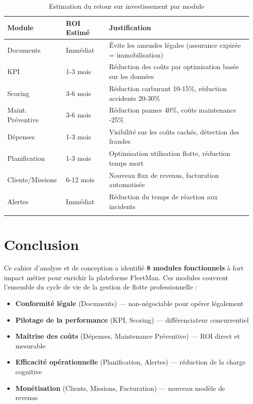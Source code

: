 \documentclass[12pt,a4paper]{report}
\begin{document}
\begin{longtable}{p{3.5cm}p{3.5cm}p{6cm}}
\toprule
\textbf{Module} & \textbf{ROI Estimé} & \textbf{Justification} \\
\midrule
\endhead
Documents & Immédiat & Évite les amendes légales (assurance expirée = immobilisation) \\
KPI & 1-3 mois & Réduction des coûts par optimisation basée sur les données \\
Scoring & 3-6 mois & Réduction carburant 10-15\%, réduction accidents 20-30\% \\
Maint. Préventive & 3-6 mois & Réduction pannes 40\%, coûts maintenance -25\% \\
Dépenses & 1-3 mois & Visibilité sur les coûts cachés, détection des fraudes \\
Planification & 1-3 mois & Optimisation utilisation flotte, réduction temps mort \\
Clients/Missions & 6-12 mois & Nouveau flux de revenus, facturation automatisée \\
Alertes & Immédiat & Réduction du temps de réaction aux incidents \\
\bottomrule
\caption{Estimation du retour sur investissement par module}
\end{longtable}

\chapter*{Conclusion}
\thispagestyle{fancy}

Ce cahier d'analyse et de conception a identifié \textbf{8 modules fonctionnels} à fort impact métier pour enrichir la plateforme FleetMan. Ces modules couvrent l'ensemble du cycle de vie de la gestion de flotte professionnelle :

\begin{itemize}[leftmargin=2cm]
  \item \textbf{Conformité légale} (Documents) — non-négociable pour opérer légalement
  \item \textbf{Pilotage de la performance} (KPI, Scoring) — différenciateur concurrentiel
  \item \textbf{Maîtrise des coûts} (Dépenses, Maintenance Préventive) — ROI direct et mesurable
  \item \textbf{Efficacité opérationnelle} (Planification, Alertes) — réduction de la charge cognitive
  \item \textbf{Monétisation} (Clients, Missions, Facturation) — nouveau modèle de revenus
\end{itemize}
\end{document}
